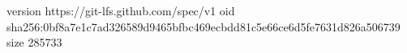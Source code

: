 version https://git-lfs.github.com/spec/v1
oid sha256:0bf8a7e1c7ad326589d9465bfbc469ecbdd81c5e66ce6d5fe7631d826a506739
size 285733
